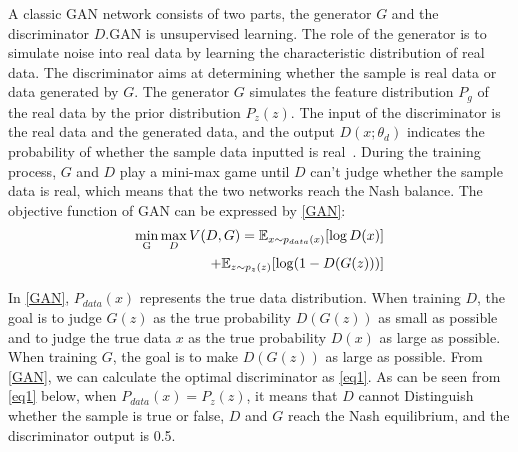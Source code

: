 \documentclass[conference]{IEEEtran}
\begin{document}
A classic GAN network consists of two parts, the generator $G$ and the discriminator $D$.GAN is unsupervised learning. The role of the generator is to simulate noise into real data by learning the characteristic distribution of real data. The discriminator aims at determining whether the sample is real data or data generated by $G$. 
The generator $G$ simulates the feature distribution $P_g$ of the real data by the prior distribution $P_z(z)$. The input of the discriminator is the real data and the generated data, and the output $D(x;\theta_d)$ indicates the probability of whether the sample data inputted  is real~\cite{r11}. During the training process, $G$ and $D$ play a mini-max game until $D$ can't judge whether the sample data is real, which means that the two networks reach the Nash balance. The objective function of GAN can be expressed by \eqref{GAN}:
\begin{equation}
\begin{split}
\label{GAN}
	\mathop {\min }\limits_{\rm{G}} \mathop {\max }\limits_D V(D,G) = \mathbb{E}_{x\sim{p_{data}}(x)}[\log D(x)] \\
+ {\mathbb{E}_{z\sim{p_z}(z)}}[\log (1 - D(G(z)))]
\end{split}
\end{equation}

In \eqref{GAN}, $P_{data}(x)$ represents the true data distribution. When training $D$, the goal is to judge $G(z)$ as the true probability $D(G(z))$ as small as possible and to judge the true data $x$ as the true probability $D\left(x\right)$ as large as possible. When training $G$, the goal is to make $D(G(z))$ as large as possible. From \eqref{GAN}, we can calculate the optimal discriminator as \eqref{eq1}. As can be seen from \eqref{eq1} below, when $P_{data}\left(x\right)=P_z\left(z\right)$, it means that $D$ cannot Distinguish whether the sample is true or false, $D$ and $G$ reach the Nash equilibrium, and the discriminator output is 0.5.
\end{document}
